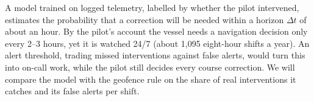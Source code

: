 \documentclass[sigconf]{acmart}
\begin{document}
A model trained on logged telemetry, labelled by whether the pilot intervened, estimates the probability that a correction will be needed within a horizon $\Delta t$ of about an hour. By the pilot's account the vessel needs a navigation decision only every 2--3 hours, yet it is watched 24/7 (about 1,095 eight-hour shifts a year). An alert threshold, trading missed interventions against false alerts, would turn this into on-call work, while the pilot still decides every course correction. We will compare the model with the geofence rule on the share of real interventions it catches and its false alerts per shift.



\end{document}
